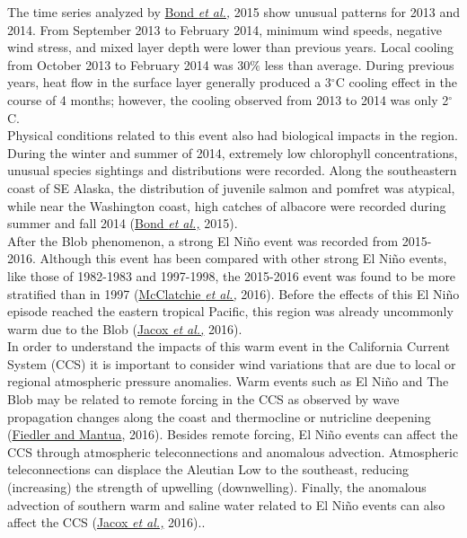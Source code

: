 \documentclass{article} %
\begin{document}
The time series analyzed by \hyperlink{bond}{Bond \textit{et al.,}} 2015 show unusual patterns for 2013 and 2014. From September 2013 to February 2014, minimum wind speeds, negative wind stress, and mixed layer depth were lower than previous years. Local cooling from October 2013 to February 2014 was 30$\%$ less than average. During previous years, heat flow in the surface layer generally produced a 3$^{\circ}$C cooling effect in the course of 4 months; however, the cooling observed from 2013 to 2014 was only 2$^{\circ}$C.\\

Physical conditions related to this event also had biological impacts in the region. During the winter and summer of 2014, extremely low chlorophyll concentrations, unusual species sightings and distributions were recorded. Along the southeastern coast of SE Alaska, the distribution of juvenile salmon and pomfret was atypical, while near the Washington coast, high catches of albacore were recorded during summer and fall 2014 (\hyperlink{bond}{Bond \textit{et al.,}} 2015).\\

After the Blob phenomenon, a strong El Niño event was recorded from 2015-2016. Although this event has been compared with other strong El Niño events, like those of 1982-1983 and 1997-1998, the 2015-2016 event was found to be more stratified than in 1997 (\hyperlink{mcclatchie}{McClatchie \textit{et al.,}} 2016). Before the effects of this El Niño episode reached the eastern tropical Pacific, this region was already uncommonly warm due to the Blob (\hyperlink{jacox}{Jacox \textit{et al.,}} 2016).\\

In order to understand the impacts of this warm event in the California Current System (CCS) it is important to consider wind variations that are due to local or regional atmospheric pressure anomalies. Warm events such as El Niño and The Blob may be related to remote forcing in the CCS as observed by wave propagation changes along the coast and thermocline or nutricline deepening (\hyperlink{fiedler}{Fiedler and Mantua}, 2016). Besides remote forcing, El Niño events can affect the CCS through atmospheric teleconnections and anomalous advection. Atmospheric teleconnections can displace the Aleutian Low to the southeast, reducing (increasing) the strength of upwelling (downwelling). Finally, the anomalous advection of southern warm and saline water related to El Niño events can also affect the CCS (\hyperlink{jacox}{Jacox \textit{et al.,}} 2016)..\\
\end{document}

